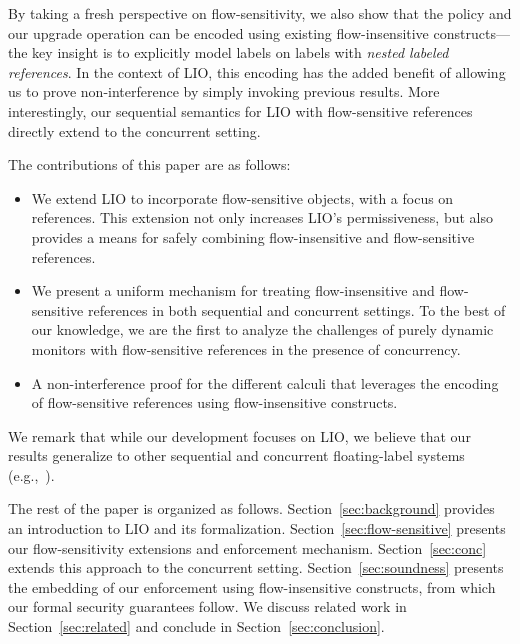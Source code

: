 By taking a fresh perspective on flow-sensitivity, we also show that the {\nsu}
policy and our upgrade operation can be encoded using existing flow-insensitive
constructs---the key insight is to explicitly model labels on labels with
\emph{nested labeled references}.
%
In the context of LIO, this encoding has the added benefit of allowing us to prove
non-interference by simply invoking previous results.
%
More interestingly, our sequential semantics for LIO with flow-sensitive
references directly extend to the concurrent setting.
 
The contributions of this paper are as follows:
\begin{itemize}

\item We extend LIO to incorporate flow-sensitive objects, with a focus on
references. This extension not only increases LIO's permissiveness, but also provides a
means for safely combining flow-insensitive and flow-sensitive references.

\item We present a uniform mechanism for treating flow-insensitive and
flow-sensitive references in both sequential and concurrent settings. To the
best of our knowledge, we are the first to analyze the challenges of purely
dynamic monitors with flow-sensitive references in the presence of concurrency.

\item A non-interference proof for the different calculi that leverages the
encoding of flow-sensitive references using flow-insensitive constructs.
\end{itemize}
%
We remark that while our development focuses on LIO, we believe that
our results generalize to other sequential and concurrent
floating-label systems (e.g.,~\cite{Breeze, Efstathopoulos:2005,
zeldovich:histar, krohn:flume}).

The rest of the paper is organized as follows. Section~\ref{sec:background}
provides an introduction to LIO and its formalization.
Section~\ref{sec:flow-sensitive} presents our flow-sensitivity extensions and
enforcement mechanism. Section~\ref{sec:conc} extends this approach to the
concurrent setting. Section~\ref{sec:soundness} presents the embedding of our
enforcement using flow-insensitive constructs, from which our formal security
guarantees follow.  We discuss related work in Section~\ref{sec:related} and
conclude in Section~\ref{sec:conclusion}.


